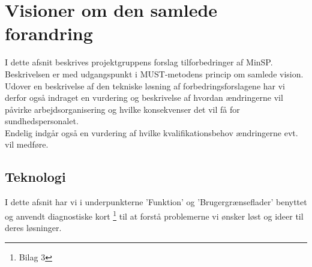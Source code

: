\section{Visioner om den samlede forandring}
I dette afsnit beskrives projektgruppens forslag tilforbedringer af MinSP. Beskrivelsen er med udgangspunkt i MUST-metodens princip om samlede vision.\\
Udover en beskrivelse af den tekniske løsning af forbedringsforslagene har vi derfor også indraget en vurdering og beskrivelse af hvordan ændringerne vil påvirke arbejdsorganisering og hvilke konsekvenser det vil få for sundhedspersonalet. \\
Endelig indgår også en vurdering af hvilke kvalifikationsbehov ændringerne evt. vil medføre.
\subsection{Teknologi}
I dette afsnit har vi i underpunkterne 'Funktion' og 'Brugergrænseflader' benyttet og anvendt diagnostiske kort \footnote{Bilag 3} til at forstå problemerne vi ønsker løst og ideer til deres løsninger. \\
%
%
